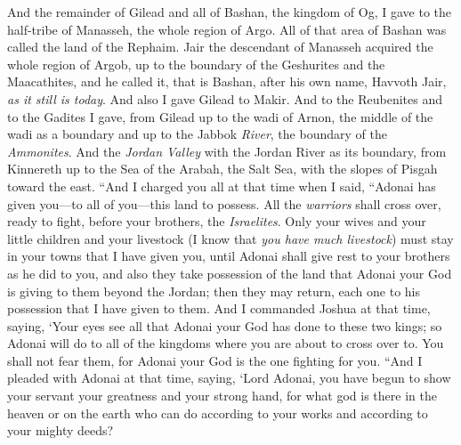 \begin{biblechapter}
\verse And the remainder of Gilead and all of Bashan, the kingdom of Og, I gave to the half-tribe of Manasseh, the whole region of Argo. All of that area of Bashan was called the land of the Rephaim.
\verse Jair the descendant of Manasseh acquired the whole region of Argob, up to the boundary of the Geshurites and the Maacathites, and he called it, that is Bashan, after his own name, Havvoth Jair, \textit{as it still is today}.
\verse And also I gave Gilead to Makir.
\verse And to the Reubenites and to the Gadites I gave, from Gilead up to the wadi of Arnon, the middle of the wadi as a boundary and up to the Jabbok \textit{River}, the boundary of the \textit{Ammonites}.
\verse And the \textit{Jordan Valley} with the Jordan River as its boundary, from Kinnereth up to the Sea of the Arabah, the Salt Sea, with the slopes of Pisgah toward the east.
\verse “And I charged you all at that time when I said, “Adonai has given you—to all of you—this land to possess. All the \textit{warriors} shall cross over, ready to fight, before your brothers, the \textit{Israelites}.
\verse Only your wives and your little children and your livestock (I know that \textit{you have much livestock}) must stay in your towns that I have given you,
\verse until Adonai shall give rest to your brothers as he did to you, and also they take possession of the land that Adonai your God is giving to them beyond the Jordan; then they may return, each one to his possession that I have given to them.
\verse And I commanded Joshua at that time, saying, ‘Your eyes see all that Adonai your God has done to these two kings; so Adonai will do to all of the kingdoms where you are about to cross over to.
\verse You shall not fear them, for Adonai your God is the one fighting for you.
\verse “And I pleaded with Adonai at that time, saying,
\verse ‘Lord Adonai, you have begun to show your servant your greatness and your strong hand, for what god is there in the heaven or on the earth who can do according to your works and according to your mighty deeds?

\end{biblechapter}
